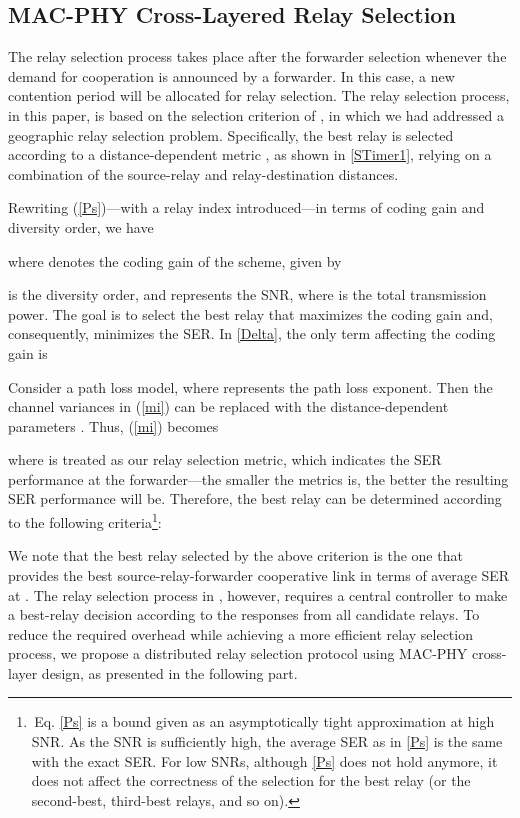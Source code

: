 \documentclass[journal,twoside,final]{IEEEtran}
\begin{document}
\subsection{MAC-PHY Cross-Layered Relay Selection}\label{CBR}
The relay selection process takes place after the forwarder selection whenever the demand for cooperation is announced by a forwarder. In this case, a new contention period will be allocated for relay selection.
The relay selection process, in this paper, is based on the selection criterion of \cite{syue09}, in which we had addressed a geographic relay selection problem.
Specifically, the best relay is selected according to a distance-dependent metric , as shown in \eqref{STimer1}, relying on a combination of the source-relay and relay-destination distances.


Rewriting (\ref{Ps})---with a relay index  introduced---in terms of coding gain and diversity order, we have

where  denotes the coding gain of the scheme, given by

 is the diversity order, and  represents the SNR, where  is the total transmission power. The goal is to select the best relay that maximizes the coding gain  and, consequently, minimizes the SER. In \eqref{Delta}, the only term affecting the coding gain is

Consider a  path loss model, where  represents the path loss exponent. Then the channel variances  in (\ref{mi}) can be replaced with the distance-dependent parameters . Thus, (\ref{mi}) becomes

where  is treated as our relay selection metric, which indicates the SER performance at the forwarder---the smaller the metrics is, the better the resulting SER performance will be. Therefore, the best relay can be determined according to the following criteria\footnote{\,Eq. \eqref{Ps} is a bound given as an asymptotically tight approximation at high SNR. As the SNR is sufficiently high, the average SER as in \eqref{Ps} is the same with the exact SER. For low SNRs, although \eqref{Ps} does not hold anymore, it does not affect the correctness of the selection for the best relay (or the second-best, third-best relays, and so on).}:


We note that the best relay selected by the above criterion is the one that provides the best source-relay-forwarder cooperative link in terms of average SER at . The relay selection process in \cite{syue09}, however, requires a central controller to make a best-relay decision according to the responses from all candidate relays. To reduce the required overhead while achieving a more efficient relay selection process, we propose a distributed relay selection protocol using MAC-PHY cross-layer design, as presented in the following part.
\end{document}
